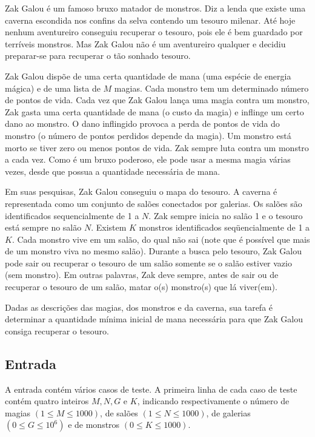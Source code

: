 Zak Galou é um famoso bruxo matador de monstros. Diz a lenda que existe uma
caverna escondida nos confins da selva contendo um tesouro milenar. Até hoje
nenhum aventureiro conseguiu recuperar o tesouro, pois ele é bem guardado por
terríveis monstros. Mas Zak Galou não é um aventureiro qualquer e decidiu
preparar-se para recuperar o tão sonhado tesouro.

Zak Galou dispõe de uma certa quantidade de mana (uma espécie de energia mágica)
e de uma lista de $M$ magias. Cada monstro tem um determinado número de pontos
de vida. Cada vez que Zak Galou lança uma magia contra um monstro, Zak gasta
uma certa quantidade de mana (o custo da magia) e inflinge um certo dano ao
monstro. O dano inflingido provoca a perda de pontos de vida do monstro (o
número de pontos perdidos depende da magia). Um monstro está morto
se tiver zero ou menos pontos de vida. Zak sempre luta contra um monstro a
cada vez. Como é um bruxo poderoso, ele pode usar a mesma magia várias
vezes, desde que possua a quantidade necessária de mana.

Em suas pesquisas, Zak Galou conseguiu o mapa do tesouro. A caverna é
representada como um conjunto de salões conectados por galerias. Os salões
são identificados sequencialmente de 1 a $N$. Zak sempre inicia no salão 1 e o
tesouro está sempre no salão $N$. Existem $K$ monstros identificados
seqüencialmente de 1 a $K$. Cada monstro vive em um salão, do qual não sai
(note que é possível que mais de um monstro viva no mesmo salão). Durante a
busca pelo tesouro, Zak Galou pode sair ou recuperar o tesouro de um salão
somente se o salão estiver vazio (sem monstro). Em outras palavras, Zak deve
sempre, antes de sair ou de recuperar o tesouro de um salão, matar o(s)
monstro(s) que lá viver(em).

Dadas as descrições das magias, dos monstros e da caverna, sua tarefa é
determinar a quantidade mínima inicial de mana necessária para que Zak Galou
consiga recuperar o tesouro.


\subsection*{Entrada}

A entrada contém vários casos de teste. A primeira linha de cada caso de teste
contém quatro inteiros $M, N, G$ e $K$, indicando respectivamente o número de magias
$(1 \leq M \leq 1000)$, de salões $(1 \leq N \leq 1000)$, de galerias $(0 \leq G
        \leq 10^6)$ e de monstros $(0 \leq K \leq 1000)$.


